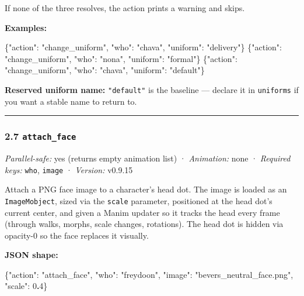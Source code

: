 \documentclass[
  11pt,
]{book}
\newenvironment{Shaded}{}{}
\newcommand{\DataTypeTok}[1]{\textcolor[rgb]{0.56,0.13,0.00}{#1}}
\newcommand{\DecValTok}[1]{\textcolor[rgb]{0.25,0.63,0.44}{#1}}
\newcommand{\ErrorTok}[1]{\textcolor[rgb]{1.00,0.00,0.00}{\textbf{#1}}}
\newcommand{\FunctionTok}[1]{\textcolor[rgb]{0.02,0.16,0.49}{#1}}
\newcommand{\StringTok}[1]{\textcolor[rgb]{0.25,0.44,0.63}{#1}}
\begin{document}
If none of the three resolves, the action prints a warning and skips.

\textbf{Examples:}

\begin{Shaded}
\begin{Highlighting}[]
\FunctionTok{\{}\DataTypeTok{"action"}\FunctionTok{:} \StringTok{"change\_uniform"}\FunctionTok{,} \DataTypeTok{"who"}\FunctionTok{:} \StringTok{"chava"}\FunctionTok{,} \DataTypeTok{"uniform"}\FunctionTok{:} \StringTok{"delivery"}\FunctionTok{\}}
\FunctionTok{\{}\DataTypeTok{"action"}\FunctionTok{:} \StringTok{"change\_uniform"}\FunctionTok{,} \DataTypeTok{"who"}\FunctionTok{:} \StringTok{"nona"}\FunctionTok{,}  \DataTypeTok{"uniform"}\FunctionTok{:} \StringTok{"formal"}\FunctionTok{\}}
\FunctionTok{\{}\DataTypeTok{"action"}\FunctionTok{:} \StringTok{"change\_uniform"}\FunctionTok{,} \DataTypeTok{"who"}\FunctionTok{:} \StringTok{"chava"}\FunctionTok{,} \DataTypeTok{"uniform"}\FunctionTok{:} \StringTok{"default"}\FunctionTok{\}}
\end{Highlighting}
\end{Shaded}

\textbf{Reserved uniform name:} \texttt{"default"} is the baseline ---
declare it in \texttt{uniforms} if you want a stable name to return to.

\begin{center}\rule{0.5\linewidth}{0.5pt}\end{center}

\subsubsection{\texorpdfstring{2.7
\texttt{attach\_face}}{2.7 attach\_face}}\label{attach_face}

\emph{Parallel-safe:} yes (returns empty animation list) ·
\emph{Animation:} none · \emph{Required keys:} \texttt{who},
\texttt{image} · \emph{Version:} v0.9.15

Attach a PNG face image to a character's head dot. The image is loaded
as an \texttt{ImageMobject}, sized via the \texttt{scale} parameter,
positioned at the head dot's current center, and given a Manim updater
so it tracks the head every frame (through walks, morphs, scale changes,
rotations). The head dot is hidden via opacity-0 so the face replaces it
visually.

\textbf{JSON shape:}

\begin{Shaded}
\begin{Highlighting}[]
\FunctionTok{\{}\DataTypeTok{"action"}\FunctionTok{:} \StringTok{"attach\_face"}\FunctionTok{,} \DataTypeTok{"who"}\FunctionTok{:} \StringTok{"freydoon"}\FunctionTok{,}
 \DataTypeTok{"image"}\FunctionTok{:} \StringTok{"bevers\_neutral\_face.png"}\FunctionTok{,} \DataTypeTok{"scale"}\FunctionTok{:} \DecValTok{0}\ErrorTok{.}\DecValTok{4}\FunctionTok{\}}
\end{Highlighting}
\end{Shaded}
\end{document}
